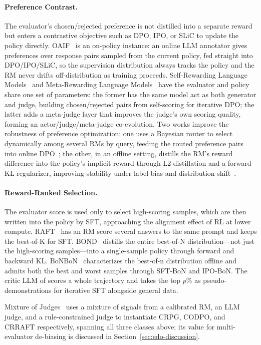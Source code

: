 \paragraph{Preference Contrast.} The evaluator's chosen/rejected preference is not distilled into a separate reward but enters a contrastive objective such as DPO, IPO, or SLiC to update the policy directly. OAIF~\cite{Guo24} is an on-policy instance: an online LLM annotator gives preferences over response pairs sampled from the current policy, fed straight into DPO/IPO/SLiC, so the supervision distribution always tracks the policy and the RM never drifts off-distribution as training proceeds. Self-Rewarding Language Models~\cite{Yua24} and Meta-Rewarding Language Models~\cite{Wu24d} have the evaluator and policy share one set of parameters: the former has the same model act as both generator and judge, building chosen/rejected pairs from self-scoring for iterative DPO; the latter adds a meta-judge layer that improves the judge's own scoring quality, forming an actor/judge/meta-judge co-evolution. Two works improve the robustness of preference optimization: one uses a Bayesian router to select dynamically among several RMs by query, feeding the routed preference pairs into online DPO~\cite{Wu25x}; the other, in an offline setting, distills the RM's reward difference into the policy's implicit reward through L2 distillation and a forward-KL regularizer, improving stability under label bias and distribution shift~\cite{Fis24}.

\paragraph{Reward-Ranked Selection.} The evaluator score is used only to select high-scoring samples, which are then written into the policy by SFT, approaching the alignment effect of RL at lower compute. RAFT~\cite{Don23} has an RM score several answers to the same prompt and keeps the best-of-K for SFT. BOND~\cite{Ses24} distills the entire best-of-N distribution---not just the high-scoring samples---into a single-sample policy through forward and backward KL. BoNBoN~\cite{Gui24} characterizes the best-of-n distribution offline and admits both the best and worst samples through SFT-BoN and IPO-BoN. The critic LLM of \cite{Gon24b} scores a whole trajectory and takes the top $p\%$ as pseudo-demonstrations for iterative SFT alongside general data.

Mixture of Judges~\cite{Xu24d} uses a mixture of signals from a calibrated RM, an LLM judge, and a rule-constrained judge to instantiate CRPG, CODPO, and CRRAFT respectively, spanning all three classes above; its value for multi-evaluator de-biasing is discussed in Section~\ref{sec:edo-discussion}.

